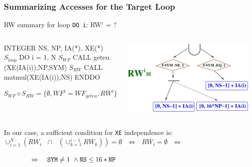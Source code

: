 \documentclass{beamer}
\renewcommand{\emph}[1]{\textcolor{structure}{#1}}
\newcommand{\emp}[1]{\textcolor{DikuRed}{ #1}}
\newcommand{\mymath}[1]{$ #1 $}
\newcommand{\myindx}[1]{_{#1}}
\newcommand{\myindu}[1]{^{#1}}
\begin{document}
\begin{frame}[fragile,t]
  \frametitle{Summarizing Accesses for the Target Loop}

\begin{block}{RW summary for loop {\tt DO i}: RW$^i$ = ? } \vspace{-1ex}
\begin{columns} 
\begin{colorcode}[fontsize=\scriptsize]
        INTEGER NS, NP, IA(*), XE(*)
\mymath{S\myindx{loop}}    \emph{DO i = 1, N}
\mymath{S\myindx{WF}}      CALL geteu (XE(IA(i)),NP,SYM)
\mymath{S\myindx{RW}}      CALL matmul(XE(IA(i)),NS)
        \emph{ENDDO}

\emp{\mymath{S\myindx{WF} \diamond S\myindx{RW} = \{\emptyset, WF\myindu{i}=WF\myindx{geteu}, RW\myindu{i}\}}}
\end{colorcode}
\begin{center}
\includegraphics[height=15ex]{ParTeaserFigs/RW_IND_XE}
\end{center}
\end{columns}
\end{block}

\bigskip

In our case, a sufficient condition for {\tt XE} independence is: \bigskip \\ 
$\cup_{i=1}^{N}(RW_i \mbox{ }\cap\mbox{ } (\cup_{k=1}^{i-1}RW_k)) = \emptyset~~~\Leftrightarrow~~~RW_i = \emptyset~~~\Leftrightarrow$

\bigskip

$~~~~~~~~~~~~~~~~~\Leftrightarrow~~~$  
\emph{${\tt SYM}\neq 1\mbox{ }\wedge {\tt NS}\leq 16*{\tt NP}$} 
\end{frame}
\end{document}
